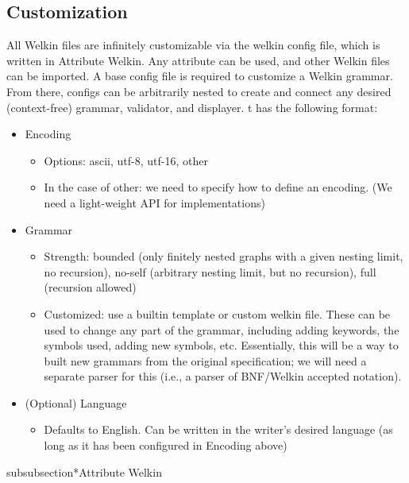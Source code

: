 \subsection{Customization}
All Welkin files are infinitely customizable via the welkin config file, which is written in Attribute Welkin. Any attribute can be used, and other Welkin files can be imported. A base config file is required to customize a Welkin grammar. From there, configs can be arbitrarily nested to create and connect any desired (context-free) grammar, validator, and displayer.
t has the following format:
\begin{itemize}
	\item Encoding
				\begin{itemize}
					\item Options: ascii, utf-8, utf-16, other
					\item In the case of other: we need to specify how to define an encoding. (We need a light-weight API for implementations)
				\end{itemize}
	\item Grammar
				\begin{itemize}
					\item Strength: bounded (only finitely nested graphs with a given nesting limit, no recursion), no-self (arbitrary nesting limit, but no recursion), full (recursion allowed)
					\item Customized: use a builtin template or custom welkin file. These can be used to change any part of the grammar, including adding keywords, the symbols used, adding new symbols, etc. Essentially, this will be a way to built new grammars from the original specification; we will need a separate parser for this (i.e., a parser of BNF/Welkin accepted notation).
				\end{itemize}

	\item (Optional) Language
				\begin{itemize}
					\item Defaults to English. Can be written in the writer's desired language (as long as it has been configured in Encoding above)
				\end{itemize}
\end{itemize}

subsubsection*{Attribute Welkin}

